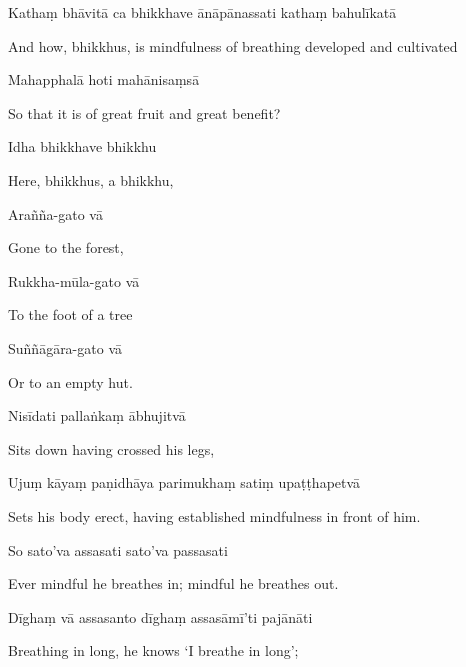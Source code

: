 Kathaṃ bhāvitā ca bhikkhave ānāpānassati kathaṃ bahulīkatā

\begin{english}
  And how, bhikkhus, is mindfulness of breathing developed and cultivated
\end{english}

Mahapphalā hoti mahānisaṃsā

\begin{english}
  So that it is of great fruit and great benefit?
\end{english}

Idha bhikkhave bhikkhu

\begin{english}
  Here, bhikkhus, a bhikkhu,
\end{english}

Arañña-gato vā

\begin{english}
  Gone to the forest,
\end{english}

Rukkha-mūla-gato vā

\begin{english}
  To the foot of a tree
\end{english}

Suññāgāra-gato vā

\begin{english}
  Or to an empty hut.
\end{english}

Nisīdati pallaṅkaṃ ābhujitvā

\begin{english}
  Sits down having crossed his legs,
\end{english}

Ujuṃ kāyaṃ paṇidhāya parimukhaṃ satiṃ upaṭṭhapetvā

\begin{english}
  Sets his body erect, having established mindfulness in front of him.
\end{english}

So sato'va assasati sato'va passasati

\begin{english}
  Ever mindful he breathes in; mindful he breathes out.
\end{english}

Dīghaṃ vā assasanto dīghaṃ assasāmī'ti pajānāti

\begin{english}
  Breathing in long, he knows `I breathe in long';
\end{english}

